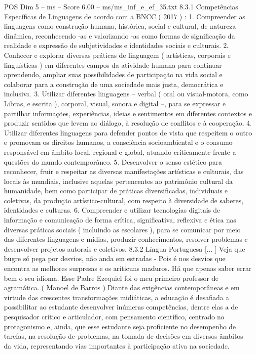 \begin{textsample}{POS Dim 5 – ms – Score 6.00 – ms/ms\_inf\_e\_ef\_35.txt}  \label{ex:f5_pos_214}
8.3.1 Competências Específicas de Linguagens de acordo com a BNCC ( 2017 ) : 1.
Compreender as linguagens como construção humana, histórica, social e cultural, de natureza dinâmica, reconhecendo -as e valorizando -as como formas de significação da realidade e expressão de subjetividades e identidades sociais e culturais. 2.
Conhecer e explorar diversas práticas de linguagem ( artísticas, corporais e linguísticas ) em diferentes campos da atividade humana para continuar aprendendo, ampliar suas possibilidades de participação na vida social e colaborar para a construção de uma sociedade mais justa, democrática e inclusiva. 3.
Utilizar diferentes linguagens – verbal ( oral ou visual-motora, como Libras, e escrita ), corporal, visual, sonora e digital –, para se expressar e partilhar informações, experiências, ideias e sentimentos em diferentes contextos e produzir sentidos que levem ao diálogo, à resolução de conflitos e à cooperação. 4.
Utilizar diferentes linguagens para defender pontos de vista que respeitem o outro e promovam os direitos humanos, a consciência socioambiental e o consumo responsável em âmbito local, regional e global, atuando criticamente frente a questões do mundo contemporâneo. 5.
Desenvolver o senso estético para reconhecer, fruir e respeitar as diversas manifestações artísticas e culturais, das locais às mundiais, inclusive aquelas pertencentes ao patrimônio cultural da humanidade, bem como participar de práticas diversificadas, individuais e coletivas, da produção artístico-cultural, com respeito à diversidade de saberes, identidades e culturas. 6.
Compreender e utilizar tecnologias digitais de informação e comunicação de forma crítica, significativa, reflexiva e ética nas diversas práticas sociais ( incluindo as escolares ), para se comunicar por meio das diferentes linguagens e mídias, produzir conhecimentos, resolver problemas e desenvolver projetos autorais e coletivos. 8.3.2 Língua Portuguesa [... ] Veja que bugre só pega por desvios, não anda em estradas - Pois é nos desvios que encontra as melhores surpresas e os ariticuns maduros.
Há que apenas saber errar bem o seu idioma.
Esse Padre Ezequiel foi o meu primeiro professor de agramática. ( Manoel de Barros ) Diante das exigências contemporâneas e em virtude das crescentes transformações midiáticas, a educação é desafiada a possibilitar ao estudante desenvolver inúmeras competências, dentre elas a de pesquisador crítico e articulador, com pensamento científico, centrado no protagonismo e, ainda, que esse estudante seja proficiente no desempenho de tarefas, na resolução de problemas, na tomada de decisões em diversos âmbitos da vida, representando vias importantes à participação ativa na sociedade.

\end{textsample}
